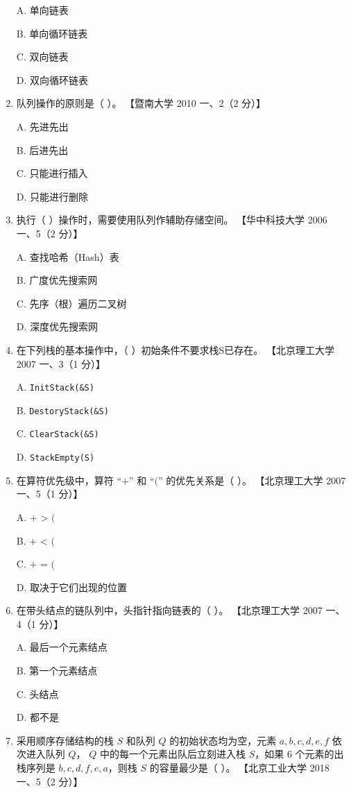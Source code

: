 \documentclass[lang=cn,newtx,10pt,scheme=chinese]{../../elegantbook}
\begin{document}
\begin{enumerate}
    A. 单向链表  

    B. 单向循环链表  

    C. 双向链表  

    D. 双向循环链表  

    \item 队列操作的原则是（ ）。  
    【暨南大学 2010 一、2（2 分）】  

    A. 先进先出  

    B. 后进先出  

    C. 只能进行插入  

    D. 只能进行删除  

    \item 执行（ ）操作时，需要使用队列作辅助存储空间。  
    【华中科技大学 2006 一、5（2 分）】  

    A. 查找哈希（Hash）表  

    B. 广度优先搜索网  

    C. 先序（根）遍历二叉树  

    D. 深度优先搜索网  

    \item 在下列栈的基本操作中，（ ）初始条件不要求栈S已存在。  
    【北京理工大学 2007 一、3（1 分）】  

    A. \texttt{InitStack(\&S)}  

    B. \texttt{DestoryStack(\&S)}  

    C. \texttt{ClearStack(\&S)}  

    D. \texttt{StackEmpty(S)}  

    \item 在算符优先级中，算符 “$+$” 和 “$($” 的优先关系是（ ）。  
    【北京理工大学 2007 一、5（1 分）】  

    A. $+$ > $($  

    B. $+$ < $($  

    C. $+$ = $($  

    D. 取决于它们出现的位置  

    \item 在带头结点的链队列中，头指针指向链表的（ ）。  
    【北京理工大学 2007 一、4（1 分）】  

    A. 最后一个元素结点  

    B. 第一个元素结点  

    C. 头结点  

    D. 都不是  

    \item 采用顺序存储结构的栈 $S$ 和队列 $Q$ 的初始状态均为空，元素 $a, b, c, d, e, f$ 依次进入队列 $Q$，
    $Q$ 中的每一个元素出队后立刻进入栈 $S$，如果 6 个元素的出栈序列是 $b,c,d,f,e,a$，则栈 $S$ 的容量最少是（ ）。  
    【北京工业大学 2018 一、5（2 分）】  


\end{enumerate}
\end{document}
